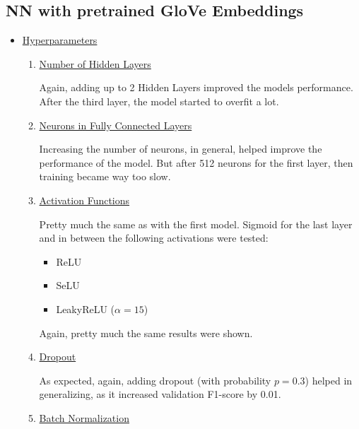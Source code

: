 \documentclass[12pt]{report}
\begin{document}
\subsection*{NN with pretrained GloVe Embeddings}
\begin{itemize}
    \item \underline{Hyperparameters}
        \bigskip

\begin{enumerate}

    \item \underline{Number of Hidden Layers}
        \smallskip

        Again, adding up to 2 Hidden Layers improved the models performance. After the
        third layer, the model started to overfit a lot.

    \item \underline{Neurons in Fully Connected Layers}
        \smallskip

        Increasing the number of neurons, in general, helped improve the performance
        of the model. But after 512 neurons for the first layer, then training became
        way too slow.

    \item \underline{Activation Functions}
        \smallskip

        Pretty much the same as with the first model. Sigmoid for the last layer and in between
        the following activations were tested:
        \begin{itemize}
            \item ReLU
            \item SeLU
            \item LeakyReLU ($\alpha=15$)
        \end{itemize}
        Again, pretty much the same results were shown.

        \item \underline{Dropout}
        \smallskip

        As expected, again, adding dropout (with probability $p = 0.3$) helped in
        generalizing, as it increased validation F1-score by 0.01.

    \item \underline{Batch Normalization}
        \smallskip


\end{enumerate}
\end{itemize}
\end{document}
